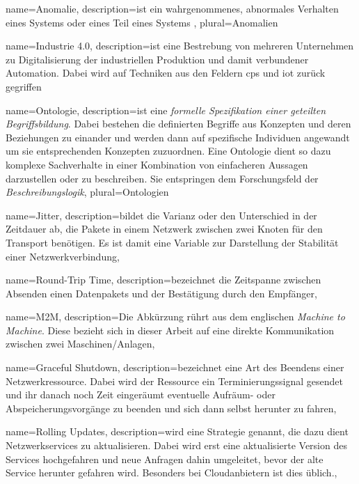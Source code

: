 {
  name={Anomalie},
  description={ist ein wahrgenommenes, abnormales Verhalten eines Systems oder eines Teil eines Systems \cite{pardo2016framework}},
  plural={Anomalien}
}

{
  name={Industrie 4.0},
  description={ist eine Bestrebung von mehreren Unternehmen zu Digitalisierung der industriellen Produktion und damit verbundener Automation. Dabei wird auf Techniken aus den Feldern \acrshort{cps} und \acrshort{iot} zurück gegriffen}
}

{
  name={Ontologie},
  description={ist eine \textit{formelle Spezifikation einer geteilten Begriffsbildung}\cite{guarino2009ontology}. Dabei bestehen die definierten Begriffe aus Konzepten und deren Beziehungen zu einander und werden dann auf spezifische Individuen angewandt um sie entsprechenden Konzepten zuzuordnen. Eine Ontologie dient so dazu komplexe Sachverhalte in einer Kombination von einfacheren Aussagen darzustellen oder zu beschreiben. Sie entspringen dem Forschungsfeld der \textit{Beschreibungslogik}\cite{roy2010exploitation}},
  plural={Ontologien}
}

{
  name={Jitter},
  description={bildet die Varianz oder den Unterschied in der Zeitdauer ab, die Pakete in einem Netzwerk zwischen zwei Knoten für den Transport benötigen. Es ist damit eine Variable zur Darstellung der Stabilität einer Netzwerkverbindung},
}

{
  name={Round-Trip Time},
  description={bezeichnet die Zeitspanne zwischen Absenden einen Datenpakets und der Bestätigung durch den Empfänger},
}

{
  name={M2M},
  description={Die Abkürzung rührt aus dem englischen \textit{Machine to Machine}. Diese bezieht sich in dieser Arbeit auf eine direkte Kommunikation zwischen zwei Maschinen/Anlagen},
}

{
  name={Graceful Shutdown},
  description={bezeichnet eine Art des Beendens einer Netzwerkressource. Dabei wird der Ressource ein Terminierungssignal gesendet und ihr danach noch Zeit eingeräumt eventuelle Aufräum- oder Abspeicherungsvorgänge zu beenden und sich dann selbst herunter zu fahren},
}

{
  name={Rolling Updates},
  description={wird eine Strategie genannt, die dazu dient Netzwerkservices zu aktualisieren. Dabei wird erst eine aktualisierte Version des Services hochgefahren und neue Anfragen dahin umgeleitet, bevor der alte Service herunter gefahren wird. Besonders bei Cloudanbietern ist dies üblich.},
}

